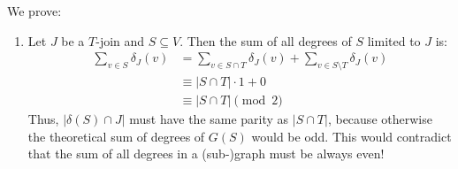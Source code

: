\begin{aufgabe} \label{ex:8.3}
    We prove:
    \begin{enumerate}[label=(\alph*)]
        \item Let $J$ be a $T$-join and $S \subseteq V$.
              Then the sum of all degrees of $S$ limited to $J$ is:
              \begin{align*}
                  \sum_{v \in S} \delta_J(v) & = \sum_{v \in S \cap T} \delta_J(v) + \sum_{v \in S \setminus T} \delta_J(v) \\
                                             & \equiv |S \cap T| \cdot 1 + 0                                                \\
                                             & \equiv |S \cap T|   \pmod{2}
              \end{align*}
              Thus, $|\delta(S) \cap J|$ must have the same parity as $|S \cap T|$,
              because otherwise the theoretical sum of degrees of $G(S)$ would be odd.
              This would contradict that the sum of all degrees in a (sub-)graph must be always even!


\end{enumerate}
\end{aufgabe}
